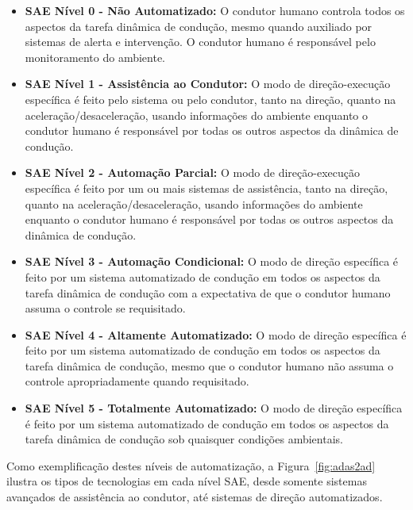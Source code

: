\begin{itemize}
	\item \textbf{SAE Nível 0 - Não Automatizado:} O condutor humano controla todos os aspectos da tarefa dinâmica de condução, mesmo quando auxiliado por sistemas de alerta e intervenção. O condutor humano é responsável pelo monitoramento do ambiente.
	
	\item \textbf{SAE Nível 1 - Assistência ao Condutor:} O modo de direção-execução específica é feito pelo sistema ou pelo condutor, tanto na direção, quanto na aceleração/desaceleração, usando informações do ambiente enquanto o condutor humano é responsável por todas os outros aspectos da dinâmica de condução.
	
	\item \textbf{SAE Nível 2 - Automação Parcial:} O modo de direção-execução específica é feito por um ou mais sistemas de assistência, tanto na direção, quanto na aceleração/desaceleração, usando informações do  ambiente enquanto o condutor humano é responsável por todas os outros aspectos da dinâmica de condução.
	
	\item \textbf{SAE Nível 3 - Automação Condicional:} O modo de direção específica é feito por um sistema automatizado de condução  em todos os aspectos da tarefa dinâmica de condução com a expectativa de que o condutor humano assuma o controle se requisitado.
	
	\item \textbf{SAE Nível 4 - Altamente Automatizado:} O modo de direção específica é feito por um sistema  automatizado de condução em todos os aspectos da tarefa dinâmica de condução, mesmo que o condutor humano não assuma o controle apropriadamente quando requisitado.
	
	\item \textbf{SAE Nível 5 - Totalmente Automatizado:} O modo de direção específica é feito por um sistema  automatizado de condução em todos os aspectos da tarefa dinâmica de condução sob quaisquer condições ambientais.
	
\end{itemize}

Como exemplificação destes níveis de automatização, a Figura~\ref{fig:adas2ad} ilustra os tipos de tecnologias em cada nível SAE, desde somente sistemas avançados de assistência ao condutor, até sistemas de direção automatizados.


